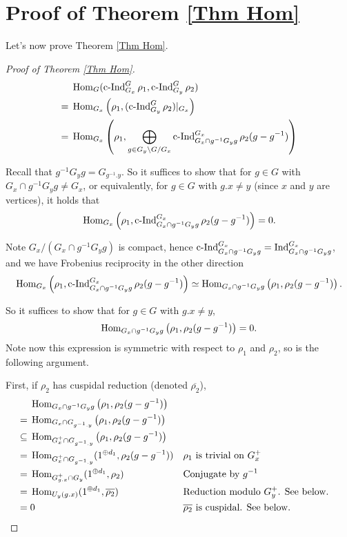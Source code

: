 	




	
	
	
	
	\section{Proof of Theorem \ref{Thm Hom}}\label{Sec Pf Thm Hom}
	
	Let's now prove Theorem \ref{Thm Hom}.
	
	\begin{proof}[Proof of Theorem \ref{Thm Hom}]
		\begin{equation*}
			\begin{aligned}
				&\operatorname{\operatorname{Hom}}_G(\operatorname{\operatorname{c-Ind}}_{G_x}^G\rho_1, \operatorname{\operatorname{c-Ind}}_{G_y}^G\rho_2)\\
				=\;&\operatorname{\operatorname{Hom}}_{G_x}\left(\rho_1,(\operatorname{\operatorname{c-Ind}}_{G_y}^G\rho_2)|_{G_x}\right)\\
				=\;& \operatorname{\operatorname{Hom}}_{G_x}\left(\rho_1, \bigoplus_{g \in {G_y\backslash G/G_x}}\operatorname{\operatorname{c-Ind}}_{G_x \cap g^{-1}G_yg}^{G_x}\rho_2(g-g^{-1})\right)
			\end{aligned}
		\end{equation*}
		
		Recall that $g^{-1}G_yg=G_{g^{-1}.y}$. So it suffices to show that for $g \in G$ with $G_x \cap g^{-1}G_yg \neq G_x$, or equivalently, for $g 
		\in G$ with $g.x \neq y$ (since $x$ and $y$ are vertices), it holds that
		$$\operatorname{\operatorname{Hom}}_{G_x}\left(\rho_1, \operatorname{\operatorname{c-Ind}}_{G_x \cap g^{-1}G_yg}^{G_x}\rho_2(g-g^{-1})\right)=0.$$
		
		Note $G_x/(G_x \cap g^{-1}G_yg)$ is compact, hence $\operatorname{\operatorname{c-Ind}}_{G_x \cap g^{-1}G_yg}^{G_x}=\operatorname{Ind}_{G_x \cap g^{-1}G_yg}^{G_x}$, and we have Frobenius reciprocity in the other direction
		$$\operatorname{\operatorname{Hom}}_{G_x}\left(\rho_1, \operatorname{\operatorname{c-Ind}}_{G_x \cap g^{-1}G_yg}^{G_x}\rho_2(g-g^{-1})\right) \simeq \operatorname{\operatorname{Hom}}_{G_x \cap g^{-1}G_yg}\left(\rho_1, \rho_2(g-g^{-1})\right).$$
		
		So it suffices to show that for $g \in G$ with $g.x \neq y$,
		$$\operatorname{\operatorname{Hom}}_{G_x \cap g^{-1}G_yg}\left(\rho_1, \rho_2(g-g^{-1})\right)=0.$$
		Note now this expression is symmetric with respect to $\rho_1$ and $\rho_2$, so is the following argument.
		
		First, if $\rho_2$ has cuspidal reduction (denoted $\overline{\rho_2}$),
		\begin{align*}    	
			& \Hom_{G_x \cap g^{-1}G_yg}\left(\rho_1, \rho_2(g-g^{-1})\right) \\
			=\;& \Hom_{G_x \cap G_{g^{-1}.y}}\left(\rho_1, \rho_2(g-g^{-1})\right) \\
			\subseteq\;& \Hom_{G_x^+ \cap G_{g^{-1}.y}}\left(\rho_1, \rho_2(g-g^{-1})\right) && %
			\\
			=\;& \Hom_{G_x^+ \cap G_{g^{-1}.y}}(1^{\oplus d_1}, \rho_2(g-g^{-1})) && \text{$\rho_1$ is trivial on $G_x^+$ }\\
			=\;& \Hom_{G_{g.x}^+ \cap G_y}(1^{\oplus d_1}, \rho_2) && \text{Conjugate by $g^{-1}$}\\
			=\;& \Hom_{U_y(g.x)}(1^{\oplus d_1}, \overline{\rho_2}) && \text{Reduction modulo $G_y^+$. See below.}\\
			=\;& 0 && \text{$\overline{\rho_2}$ is cuspidal. See below.}
		\end{align*}
		

\end{proof}
